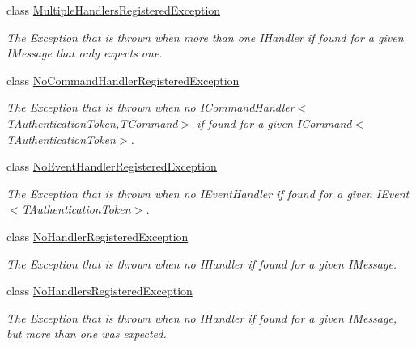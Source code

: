 \begin{DoxyCompactItemize}
class \hyperlink{classCqrs_1_1Exceptions_1_1MultipleHandlersRegisteredException}{Multiple\+Handlers\+Registered\+Exception}
\begin{DoxyCompactList}\small\item\em The Exception that is thrown when more than one I\+Handler if found for a given I\+Message that only expects one. \end{DoxyCompactList}\item 
class \hyperlink{classCqrs_1_1Exceptions_1_1NoCommandHandlerRegisteredException}{No\+Command\+Handler\+Registered\+Exception}
\begin{DoxyCompactList}\small\item\em The Exception that is thrown when no I\+Command\+Handler$<$\+T\+Authentication\+Token,\+T\+Command$>$ if found for a given I\+Command$<$\+T\+Authentication\+Token$>$. \end{DoxyCompactList}\item 
class \hyperlink{classCqrs_1_1Exceptions_1_1NoEventHandlerRegisteredException}{No\+Event\+Handler\+Registered\+Exception}
\begin{DoxyCompactList}\small\item\em The Exception that is thrown when no I\+Event\+Handler if found for a given I\+Event$<$\+T\+Authentication\+Token$>$. \end{DoxyCompactList}\item 
class \hyperlink{classCqrs_1_1Exceptions_1_1NoHandlerRegisteredException}{No\+Handler\+Registered\+Exception}
\begin{DoxyCompactList}\small\item\em The Exception that is thrown when no I\+Handler if found for a given I\+Message. \end{DoxyCompactList}\item 
class \hyperlink{classCqrs_1_1Exceptions_1_1NoHandlersRegisteredException}{No\+Handlers\+Registered\+Exception}
\begin{DoxyCompactList}\small\item\em The Exception that is thrown when no I\+Handler if found for a given I\+Message, but more than one was expected. \end{DoxyCompactList}\end{DoxyCompactItemize}
